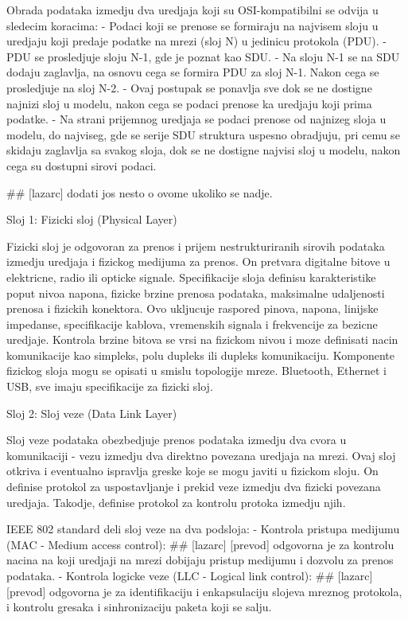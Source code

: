 \documentclass[a4paper,12pt, master]{etf}
\begin{document}
	Obrada podataka izmedju dva uredjaja koji su OSI-kompatibilni se odvija u sledecim koracima:
	- Podaci koji se prenose se formiraju na najvisem sloju u uredjaju koji predaje podatke na
	mrezi (sloj N) u jedinicu protokola (PDU).
	- PDU se prosledjuje sloju N-1, gde je poznat kao SDU.
	- Na sloju N-1 se na SDU dodaju zaglavlja, na osnovu cega se formira PDU za sloj N-1. Nakon
	cega se prosledjuje na sloj N-2.
	- Ovaj postupak se ponavlja sve dok se ne dostigne najnizi sloj u modelu, nakon cega se podaci
	prenose ka uredjaju koji prima podatke.
	- Na strani prijemnog uredjaja se podaci prenose od najnizeg sloja u modelu, do najviseg, gde
	se serije SDU struktura uspesno obradjuju, pri cemu se skidaju zaglavlja sa svakog sloja, dok
	se ne dostigne najvisi sloj u modelu, nakon cega su dostupni sirovi podaci.

	\#\# [lazarc] dodati jos nesto o ovome ukoliko se nadje.

	Sloj 1: Fizicki sloj (Physical Layer)

	Fizicki sloj je odgovoran za prenos i prijem nestrukturiranih sirovih podataka izmedju uredjaja
	i fizickog medijuma za prenos. On pretvara digitalne bitove u elektricne, radio ili opticke
	signale. Specifikacije sloja definisu karakteristike poput nivoa napona, fizicke brzine prenosa
	podataka, maksimalne udaljenosti prenosa i fizickih konektora. Ovo ukljucuje raspored pinova,
	napona, linijske impedanse, specifikacije kablova, vremenskih signala i frekvencije za bezicne
	uredjaje. Kontrola brzine bitova se vrsi na fizickom nivou i moze definisati nacin komunikacije
	kao simpleks, polu dupleks ili dupleks komunikaciju. Komponente fizickog sloja mogu se opisati
	u smislu topologije mreze. Bluetooth, Ethernet i USB, sve imaju specifikacije za fizicki sloj.

	Sloj 2: Sloj veze (Data Link Layer)

	Sloj veze podataka obezbedjuje prenos podataka izmedju dva cvora u komunikaciji - vezu izmedju
	dva direktno povezana uredjaja na mrezi. Ovaj sloj otkriva i eventualno ispravlja greske koje
	se mogu javiti u fizickom sloju. On definise protokol za uspostavljanje i prekid veze izmedju
	dva fizicki povezana uredjaja. Takodje, definise protokol za kontrolu protoka izmedju njih.

	IEEE 802 standard deli sloj veze na dva podsloja:
	- Kontrola pristupa medijumu (MAC - Medium access control): 	\#\# [lazarc] [prevod]
		odgovorna je za kontrolu nacina na koji uredjaji na mrezi dobijaju pristup medijumu i
		dozvolu za prenos podataka.
	- Kontrola logicke veze (LLC - Logical link control):			\#\# [lazarc] [prevod]
		odgovorna je za identifikaciju i enkapsulaciju slojeva mreznog protokola, i kontrolu
		gresaka i sinhronizaciju paketa koji se salju.
\end{document}
